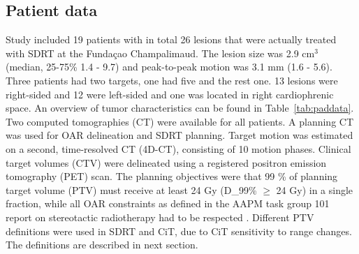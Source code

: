 \documentclass[type=dr, dr=rernat, acm$^3$entcolor=tud7b,colorbacktitle, bigchapter, openright, twoside, 12pt ]{tudthesis}
\begin{document}
\subsection{Patient data}

Study included 19 patients with in total 26 lesions that were actually treated with SDRT at the Funda\c{c}ao Champalimaud. The lesion size was 2.9 cm$^3$ (median, 25-75\% 1.4 - 9.7) and peak-to-peak motion was 3.1 mm (1.6 - 5.6).
Three patients had two targets, one had five and the rest one. 13 lesions were right-sided and 12 were left-sided and one was located in right cardiophrenic space. An overview of tumor characteristics can be found in Table~\ref{tab:paddata}.
Two computed tomographies (CT) were available for all patients. A planning CT was used for OAR delineation and SDRT planning. Target motion was estimated on a second, time-resolved CT (4D-CT), consisting of 10 motion phases. 
Clinical target volumes (CTV) were delineated using a registered positron emission tomography (PET) scan. The planning objectives were that 99 \% of planning target volume (PTV) must receive at least 24 Gy (D_{99}\% $\geq$ 24 Gy) 
in a single fraction, while all OAR constraints as defined in the AAPM task group 101 report on stereotactic radiotherapy had to be respected \cite{Benedict2010}. Different PTV definitions were used in SDRT and CiT, due to CiT sensitivity
to range changes. The definitions are described in next section.
\end{document}

